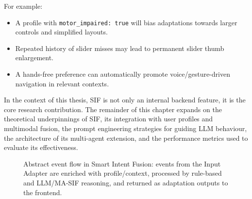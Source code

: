 \documentclass[openany]{book}
\begin{document}
For example:
\begin{itemize}
    \item A profile with \texttt{motor\_impaired: true} will bias adaptations towards larger controls and simplified layouts.
    \item Repeated history of slider misses may lead to permanent slider thumb enlargement.
    \item A hands-free preference can automatically promote voice/gesture-driven navigation in relevant contexts.
\end{itemize}

In the context of this thesis, SIF is not only an internal backend feature, it is the core research contribution.
The remainder of this chapter expands on the theoretical underpinnings of SIF, its integration with user profiles and multimodal fusion, the prompt engineering strategies for guiding LLM behaviour, the architecture of its multi-agent extension, and the performance metrics used to evaluate its effectiveness.
\begin{figure}[h]
\centering
{}
\caption{Abstract event flow in Smart Intent Fusion: events from the Input Adapter are enriched with profile/context, processed by rule-based and LLM/MA-SIF reasoning, and returned as adaptation outputs to the frontend.}
\label{fig:sif-event-flow}
\end{figure}
\end{document}
